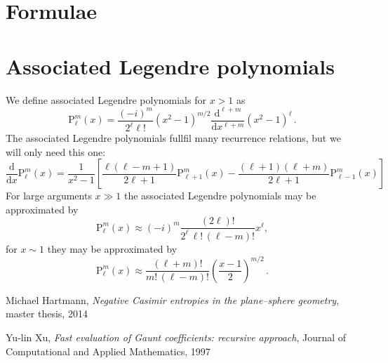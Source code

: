 \documentclass[superscriptaddress,prb]{revtex4-1}
\newcommand{\imag}{i} %
\newcommand{\Plm}[2]{{\text{P}_{#1}^{#2}}}
\begin{document}
\section{Formulae}


\section{Associated Legendre polynomials}

We define associated Legendre polynomials for $x>1$ as
\begin{equation}
\Plm{\ell}{m}(x) = \frac{(-\imag)^m}{2^\ell \ell!} \left(x^2-1\right)^{m/2} \frac{\mathrm{d}^{\ell+m}}{\mathrm{d}x^{\ell+m}} \left(x^2-1\right)^\ell \,.
\end{equation}
The associated Legendre polynomials fullfil many recurrence relations, but we will only need this one:
\begin{equation}
\label{appendix:dPlm}
\frac{\mathrm{d}}{\mathrm{d}x} \Plm{\ell}{m}(x) = \frac{1}{x^2-1} \left[
\frac{\ell(\ell-m+1)}{2\ell+1} \Plm{\ell+1}{m}(x)
-\frac{(\ell+1)(\ell+m)}{2\ell+1} \Plm{\ell-1}{m}(x)
\right]
\end{equation}
For large arguments $x\gg 1$ the associated Legendre polynomials may be approximated by
\begin{equation}
\label{appendix:Plm_gg}
\Plm{\ell}{m}(x) \approx (-\imag)^m \frac{(2\ell)!}{2^\ell \, \ell! \, (\ell-m)!} x^\ell,
\end{equation}
for $x\sim1$ they may be approximated by
\begin{equation}
\label{appendix:Plm_1}
\Plm{\ell}{m}(x) \approx \frac{(\ell+m)!}{m! \, (\ell-m)!} \left(\frac{x-1}{2}\right)^{m/2} \,.
\end{equation}



\begin{thebibliography}{99}

  Michael Hartmann,
  \emph{Negative Casimir entropies in the plane–sphere geometry}, master thesis, 2014

  Yu-lin Xu,
  \emph{Fast evaluation of Gaunt coefficients: recursive approach}, Journal of Computational and Applied Mathematics, 1997

\end{thebibliography}
\end{document}
